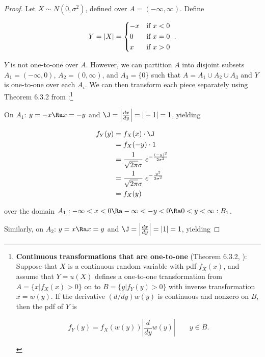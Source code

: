 \begin{proof}
  Let $X \sim N(0, \sigma^2)$, defined over $A = (-\infty, \infty)$. Define 
  
  \begin{equation*}
    Y = |X| =
    \begin{dcases*}
      -x & if $x < 0$ \\
      0 & if $x = 0$ \\
      x & if $x > 0$ \\
    \end{dcases*}
    .
  \end{equation*}

  $Y$ is not one-to-one over $A$. However, we can partition $A$ into disjoint
  subsets $A_1 = (-\infty, 0)$, $A_2 = (0, \infty)$, and $A_3 = \{0\}$ such
  that $A = A_1 \cup A_2 \cup A_3$ and $Y$ is one-to-one over each $A_i$. We
  can then transform each piece separately using Theorem 6.3.2 from
  \citet{textbook}:\footnote{\textbf{Continuous transformations that are
  one-to-one} (Theorem 6.3.2, \citealp{textbook}): Suppose that $X$ is a
  continuous random variable with pdf $f_X(x)$, and assume that $Y = u(X)$
  defines a one-to-one transformation from $A = \{x|f_X(x) > 0\}$ on to $B =
  \{y|f_Y(y) > 0\}$ with inverse transformation $x = w(y)$. If the derivative
  $(d/dy)w(y)$ is continuous and nonzero on $B$, then the pdf of $Y$ is

  \begin{equation}
    \label{eq:transformations-1-to-1}
    f_Y(y) = f_X(w(y)) \left| \frac{d}{dy} w(y) \right| \qquad y \in B.
  \end{equation}

  \label{fnote:transformations-1-to-1}
  }

  On $A_1$: $y = -x \Ra x = -y$ and $\J = \left| \frac{dx}{dy} \right| = |-1|
  = 1$, yielding

  \begin{align*}
    f_Y(y) &= f_X(x) \cdot \J \\
    &= f_X(-y) \cdot 1 \\
    &= \frac{1}{\sqrt{2\pi}\sigma} \; e^{-\frac{(-y)^2}{2\sigma^2}} \\
    &= \frac{1}{\sqrt{2\pi}\sigma} \; e^{-\frac{y^2}{2\sigma^2}} \\
    &= f_X(y)
  \end{align*}

  over the domain $A_1: -\infty < x < 0 \Ra -\infty < -y < 0 \Ra 0 < y < \infty :B_1$.

  Similarly, on $A_2$: $y = x \Ra x = y$ and $\J = \left| \frac{dx}{dy}
  \right| = |1| = 1$, yielding


\end{proof}
